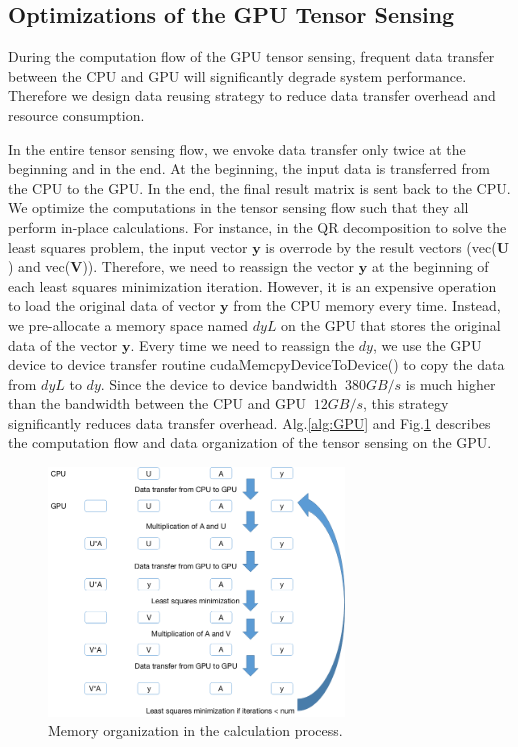 \documentclass[futureinternet,article,submit,moreauthors,pdftex,10pt,a4paper]{Definitions/mdpi}
\theoremstyle{plain}
\theoremstyle{definition}
\theoremstyle{remark}
\begin{document}
\subsection{Optimizations of the GPU Tensor Sensing}
\label{SEC_OPT}
During the computation flow of the GPU tensor sensing, frequent data transfer between the CPU and GPU will significantly degrade system performance. Therefore we design data reusing  strategy to reduce data transfer overhead and resource consumption.

In the entire tensor sensing flow, we envoke data transfer only twice at the beginning and in the end. At the beginning, the input data is transferred from the CPU to the GPU. In the end, the final result matrix is sent back to the CPU. We optimize the computations in the tensor sensing flow such that they all perform in-place calculations. For instance, in the QR decomposition to solve the least squares problem, the input vector $\mathbf{y}$ is overrode by the result vectors (vec($\mathbf{U}$) and  vec($\mathbf{V}$)). Therefore, we need to reassign the vector $\mathbf{y}$ at the beginning of each least squares minimization iteration. However, it is an expensive operation to load the original data of vector $\mathbf{y}$ from the CPU memory every time. Instead, we pre-allocate a memory space named  $dyL$ on the GPU that stores the original data of the vector $\mathbf{y}$. Every time we need to reassign the $dy$, we use the GPU device to device transfer routine cudaMemcpyDeviceToDevice() to copy the data from $dyL$ to $dy$. Since the device to device bandwidth $~380 GB/s$ is much higher than the bandwidth between the CPU and GPU $~12 GB/s$, this strategy significantly reduces data transfer overhead. Alg.\ref{alg:GPU} and Fig.\ref{Fig:dataTS} describes the computation flow and data organization of the tensor sensing on the GPU.

\begin{figure}[H]
\centering
\includegraphics[width=0.7\textwidth]{dataTS.png}
\caption{Memory organization in the calculation process.}
\label{Fig:dataTS}
\end{figure}
\end{document}
